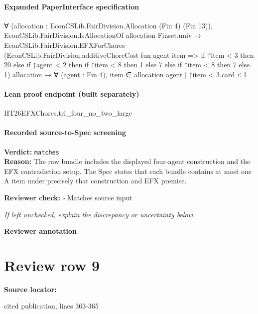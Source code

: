 \documentclass[10pt]{article}
\newcommand{\reviewerbox}{%
  \par\noindent\fbox{\parbox{0.96\linewidth}{\rule{0pt}{0.38in}}}\par
}
\newcommand{\reviewmatch}[1]{%
  \par\noindent\textbf{Reviewer check:} $\square$\; #1\par
  \noindent\emph{If left unchecked, explain the discrepancy or uncertainty below.}\par
}
\begin{document}
\paragraph{Expanded PaperInterface specification}
\begin{ReviewVerbatim}
∀ (allocation : EconCSLib.FairDivision.Allocation (Fin 4) (Fin 13)),
  EconCSLib.FairDivision.IsAllocationOf allocation Finset.univ →
    EconCSLib.FairDivision.EFXForChores
        (EconCSLib.FairDivision.additiveChoreCost fun agent item =>
          if ↑item < 3 then 20 else if ↑agent < 2 then if ↑item < 8 then 1 else 7 else if ↑item < 8 then 7 else 1)
        allocation →
      ∀ (agent : Fin 4), {item ∈ allocation agent | ↑item < 3}.card ≤ 1
\end{ReviewVerbatim}

\paragraph{Lean proof endpoint (built separately)}\begin{ReviewVerbatim}
HT26EFXChores.tri_four_no_two_large
\end{ReviewVerbatim}

\paragraph{Recorded source-to-Spec screening}
\textbf{Verdict:} \texttt{matches}
\\
\textbf{Reason:} The raw bundle includes the displayed four-agent construction and the EFX contradiction setup. The Spec states that each bundle contains at most one A item under precisely that construction and EFX premise.
\reviewmatch{Matches source input}
\noindent\textbf{Reviewer annotation}\par
\reviewerbox
\clearpage
\hypertarget{source-claim-120f295a37ffc0ce}{}
\section*{Review row 9}
\textbf{Source locator:} {\footnotesize\raggedright cited publication, lines 363-\allowbreak{}365\par}
\end{document}

